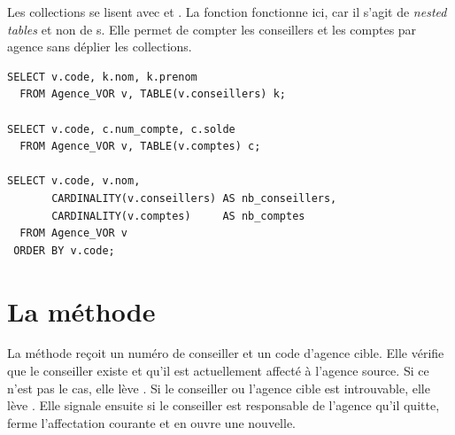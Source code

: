 Les collections se lisent avec  et
. La fonction  fonctionne ici, car il
s'agit de \emph{nested tables} et non de s. Elle permet de
compter les conseillers et les comptes par agence sans déplier les collections.

\begin{lstlisting}[caption={Interrogation des collections de la vue objet.},label={lst:e12-requetes}]
SELECT v.code, k.nom, k.prenom
  FROM Agence_VOR v, TABLE(v.conseillers) k;

SELECT v.code, c.num_compte, c.solde
  FROM Agence_VOR v, TABLE(v.comptes) c;

SELECT v.code, v.nom,
       CARDINALITY(v.conseillers) AS nb_conseillers,
       CARDINALITY(v.comptes)     AS nb_comptes
  FROM Agence_VOR v
 ORDER BY v.code;
\end{lstlisting}

\section{La méthode }

La méthode  reçoit un numéro de conseiller et un code d'agence
cible. Elle vérifie que le conseiller existe et qu'il est actuellement affecté
à l'agence source. Si ce n'est pas le cas, elle lève . Si le
conseiller ou l'agence cible est introuvable, elle lève . Elle
signale ensuite si le conseiller est responsable de l'agence qu'il quitte,
ferme l'affectation courante et en ouvre une nouvelle.


